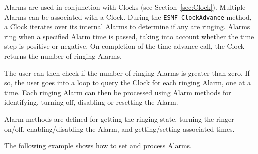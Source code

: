 
Alarms are used in conjunction with Clocks (see Section~\ref{sec:Clock}).
Multiple Alarms can be associated with a Clock.
During the {\tt ESMF\_ClockAdvance} method, a Clock iterates over its 
internal Alarms
to determine if any are ringing.  Alarms ring when a specified Alarm 
time is passed, taking into account whether the time step is positive 
or negative.  On completion of the time advance call, the Clock returns
the number of ringing Alarms.

The user can then check  if the number of ringing Alarms is greater than zero.  If so, the user
goes into a loop to query the Clock for each ringing Alarm, one at a time.
Each ringing Alarm can then be processed using Alarm methods for identifying,
turning off, disabling or resetting the Alarm.

Alarm methods are defined for getting the ringing state, turning the
ringer on/off, enabling/disabling the Alarm, and getting/setting 
associated times.

The following example shows how to set and process Alarms.